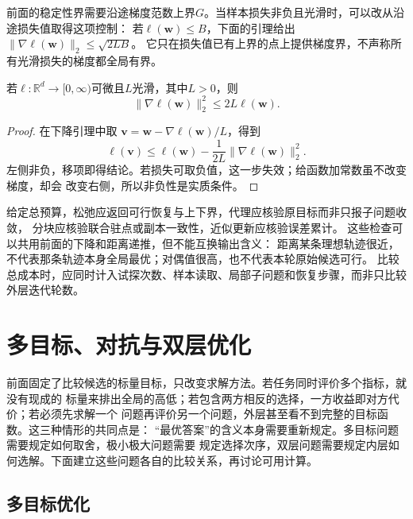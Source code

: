 前面的稳定性界需要沿途梯度范数上界$G$。当样本损失非负且光滑时，可以改从沿途损失值取得这项控制：
若$\ell(\bm w)\leq B$，下面的引理给出$\|\nabla\ell(\bm w)\|_2\leq\sqrt{2LB}$。
它只在损失值已有上界的点上提供梯度界，不声称所有光滑损失的梯度都全局有界。

\begin{lemma}[非负光滑函数的梯度自界]
\label{lem:opt-self-bounding}
若$\ell:\mathbb{R}^d\to[0,\infty)$可微且$L$光滑，其中$L>0$，则
\[
  \lVert\nabla\ell(\bm{w})\rVert_2^2\leq2L\ell(\bm{w}).
\]
\end{lemma}

\begin{proof}
在下降引理中取
$\bm{v}=\bm{w}-\nabla\ell(\bm{w})/L$，得到
\[
  \ell(\bm{v})
  \leq\ell(\bm{w})-\frac{1}{2L}
  \lVert\nabla\ell(\bm{w})\rVert_2^2.
\]
左侧非负，移项即得结论。若损失可取负值，这一步失效；给函数加常数虽不改变梯度，却会
改变右侧，所以非负性是实质条件。
\end{proof}

给定总预算，松弛应返回可行恢复与上下界，代理应核验原目标而非只报子问题收敛，
分块应核验联合驻点或副本一致性，近似更新应核验误差累计。
这些检查可以共用前面的下降和距离递推，但不能互换输出含义：
距离某条理想轨迹很近，不代表那条轨迹本身全局最优；对偶值很高，也不代表本轮原始候选可行。
比较总成本时，应同时计入试探次数、样本读取、局部子问题和恢复步骤，而非只比较外层迭代轮数。

\section{多目标、对抗与双层优化}
\label{sec:opt-decomposition-multiple-levels}

前面固定了比较候选的标量目标，只改变求解方法。若任务同时评价多个指标，就没有现成的
标量来排出全局的高低；若包含两方相反的选择，一方收益即对方代价；若必须先求解一个
问题再评价另一个问题，外层甚至看不到完整的目标函数。这三种情形的共同点是：
“最优答案”的含义本身需要重新规定。多目标问题需要规定如何取舍，极小极大问题需要
规定选择次序，双层问题需要规定内层如何选解。下面建立这些问题各自的比较关系，再讨论可用计算。

\subsection{多目标优化}
\label{sec:opt-multiobjective-saddle}

